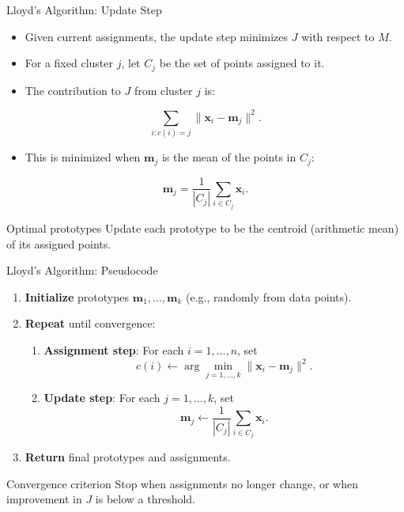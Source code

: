 \begin{frame}{Lloyd's Algorithm: Update Step}
  \begin{itemize}
    \item Given current assignments, the update step minimizes $J$ with respect to $M$.
    \item For a fixed cluster $j$, let $C_j$ be the set of points assigned to it.
    \item The contribution to $J$ from cluster $j$ is:
  \end{itemize}
  \[
  \sum_{i: c(i)=j} \|\mathbf{x}_i-\mathbf{m}_j\|^2.
  \]
  \begin{itemize}
    \item This is minimized when $\mathbf{m}_j$ is the \alert{mean} of the points in $C_j$:
  \end{itemize}
  \[
  \mathbf{m}_j = \frac{1}{|C_j|}\sum_{i\in C_j}\mathbf{x}_i.
  \]
  \begin{block}{Optimal prototypes}
    Update each prototype to be the \alert{centroid} (arithmetic mean) of its assigned points.
  \end{block}
\end{frame}

\begin{frame}{Lloyd's Algorithm: Pseudocode}
  \begin{enumerate}
    \item \textbf{Initialize} prototypes $\mathbf{m}_1,\ldots,\mathbf{m}_k$ (e.g., randomly
          from data points).
    \item \textbf{Repeat} until convergence:
      \begin{enumerate}
        \item \textbf{Assignment step}: For each $i=1,\ldots,n$, set
              \[
              c(i) \leftarrow \arg\min_{j=1,\ldots,k} \|\mathbf{x}_i-\mathbf{m}_j\|^2.
              \]
        \item \textbf{Update step}: For each $j=1,\ldots,k$, set
              \[
              \mathbf{m}_j \leftarrow \frac{1}{|C_j|}\sum_{i\in C_j}\mathbf{x}_i.
              \]
      \end{enumerate}
    \item \textbf{Return} final prototypes and assignments.
  \end{enumerate}
  \vspace{0.4em}
  \begin{alertblock}{Convergence criterion}
    Stop when assignments no longer change, or when improvement in $J$ is below a threshold.
  \end{alertblock}
\end{frame}

